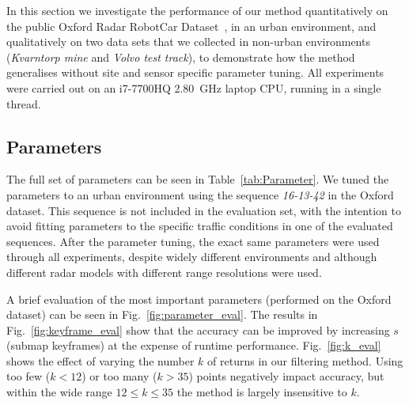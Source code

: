 In this section we investigate the performance of our method quantitatively on the public Oxford Radar RobotCar Dataset~\cite{RadarRobotCarDatasetICRA2020}, in an urban environment, and qualitatively on two data sets that we collected in non-urban environments (\textit{Kvarntorp mine} and \textit{Volvo test track}), to demonstrate how the method generalises without site and sensor specific parameter tuning. All experiments were carried out on an i7-7700HQ 2.80~GHz laptop CPU, running in a single thread.





\subsection{Parameters}
\label{ssec:Parameters}
The full set of parameters can be seen in Table~\ref{tab:Parameter}. We tuned the parameters to an urban environment using the sequence \textit{16-13-42} in the Oxford dataset. This sequence is not included in the evaluation set, with the intention to avoid fitting parameters to the specific traffic conditions in one of the evaluated sequences. After the parameter tuning, the exact same parameters were used through all experiments, despite widely different environments and although different radar models with different range resolutions were used.

A brief evaluation of the most important parameters (performed on the Oxford dataset) can be seen in Fig.~\ref{fig:parameter_eval}. 
The results in Fig.~\ref{fig:keyframe_eval} show that the accuracy can be improved by increasing $s$ (submap keyframes) at the expense of runtime performance. 
Fig.~\ref{fig:k_eval} shows the effect of varying the number $k$ of returns in our filtering method.
Using too few ($k<12$) or too many ($k>35$) points negatively impact accuracy, but within the wide range $12\leq k \leq 35$ the method is largely insensitive to $k$.

